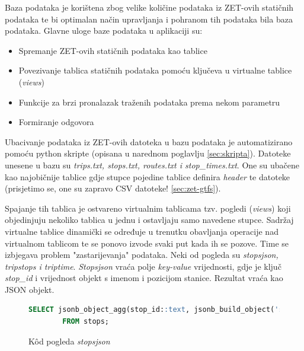 \documentclass[zavrsnirad]{fer}
\begin{document}
Baza podataka je korištena zbog velike količine podataka iz ZET-ovih statičnih podataka te bi optimalan način upravljanja i pohranom tih podataka bila baza podataka.
Glavne uloge baze podataka u aplikaciji su:
\begin{itemize}
	\item Spremanje ZET-ovih statičnih podataka kao tablice
 	\item Povezivanje tablica statičnih podataka pomoću ključeva u virtualne tablice (\textit{views})
 	\item Funkcije za brzi pronalazak traženih podataka prema nekom parametru
 	\item Formiranje odgovora
\end{itemize}

Ubacivanje podataka iz ZET-ovih datoteka u bazu podataka je automatizirano pomoću python skripte (opisana u narednom poglavlju \ref{sec:skripta}). Datoteke unesene u bazu su \textit{trips.txt, stops.txt, routes.txt i stop\_times.txt}. One su ubačene kao najobičnije tablice gdje stupce pojedine tablice definira \textit{header} te datoteke (prisjetimo se, one su zapravo CSV datoteke! \ref{sec:zet-gtfs}).

Spajanje tih tablica je ostvareno virtualnim tablicama tzv. pogledi (\textit{views}) koji objedinjuju nekoliko tablica u jednu i ostavljaju samo navedene stupce. Sadržaj virtualne tablice dinamički se određuje u trenutku obavljanja operacije nad virtualnom tablicom te se ponovo izvode svaki put kada ih se pozove. Time se izbjegava problem "zastarijevanja" podataka.
\newpage
Neki od pogleda su \textit{stopsjson, tripstops i triptime}.
\textit{Stopsjson} vraća polje \textit{key-value} vrijednosti, gdje je ključ \textit{stop\_id} i vrijednost objekt s imenom i pozicijom stanice. Rezultat vraća kao JSON objekt.
\begin{figure}[h]
	\centering
	\begin{minipage}{0.8\linewidth}
		\begin{lstlisting}[language=SQL]
 		SELECT jsonb_object_agg(stop_id::text, jsonb_build_object('stop_name', stop_name, 'stop_lat', stop_lat, 'stop_lon', stop_lon)) AS stops
		FROM stops;
		\end{lstlisting}
	\end{minipage}
	\caption{K\^od pogleda \textit{stopsjson}}
	\label{slk:stopsjson}
\end{figure}
\\
\end{document}
